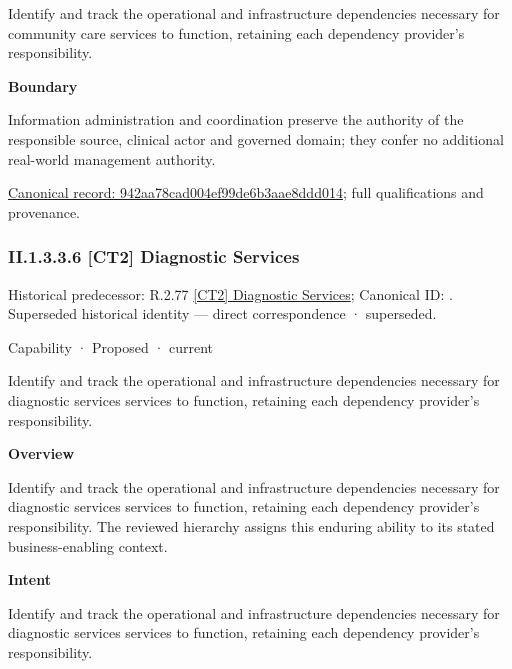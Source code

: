Identify and track the operational and infrastructure dependencies necessary for community care services to function, retaining each dependency provider's responsibility.



\textbf{Boundary}



Information administration and coordination preserve the authority of the responsible source, clinical actor and governed domain; they confer no additional real-world management authority.


{\footnotesize \href{../../../../continuum/strategy/capability/942aa78cad004ef99de6b3aae8ddd014.md}{Canonical record: 942aa78cad004ef99de6b3aae8ddd014}; full qualifications and provenance.}\par
\subsubsection*{II.1.3.3.6 [CT2] Diagnostic Services}
\label{navigation:II.1.3.3.6}

{\small Historical predecessor: R.2.77 \hyperref[element:03a57e0c9ea34f7fb7b78e5f5c85379f]{[CT2] Diagnostic Services}; Canonical ID: \texttt{}. Superseded historical identity — direct correspondence · superseded.}\par
\label{element:b825ebab42f444d8b738b4c1f489f785}
{\small Capability · Proposed · current}\par

Identify and track the operational and infrastructure dependencies necessary for diagnostic services services to function, retaining each dependency provider's responsibility.



\textbf{Overview}



Identify and track the operational and infrastructure dependencies necessary for diagnostic services services to function, retaining each dependency provider's responsibility. The reviewed hierarchy assigns this enduring ability to its stated business-enabling context.



\textbf{Intent}



Identify and track the operational and infrastructure dependencies necessary for diagnostic services services to function, retaining each dependency provider's responsibility.



